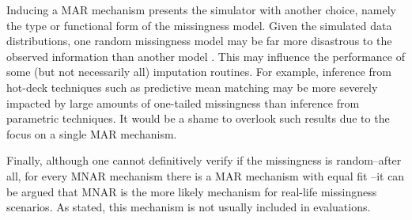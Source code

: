 \documentclass[bimj,fleqn]{w-art}
\begin{document}
Inducing a MAR mechanism presents the simulator with another choice, namely the type or functional form of the missingness model. Given the simulated data distributions, one random missingness model may be far more disastrous to the observed information than another model \citep{scho18}. This may influence the performance of some (but not necessarily all) imputation routines. For example, inference from hot-deck techniques such as predictive mean matching \citep{little1988missing, rubin1986statistical} may be more severely impacted by large amounts of one-tailed missingness than inference from parametric techniques. It would be a shame to overlook such results due to the focus on a single MAR mechanism.



Finally, although one cannot definitively verify if the missingness is random--after all, for every MNAR mechanism there is a MAR mechanism with equal fit \citep{molenberghs2008every}--it can be argued that MNAR is the more likely mechanism for real-life missingness scenarios. As stated, this mechanism is not usually included in evaluations.  %

\end{document}
